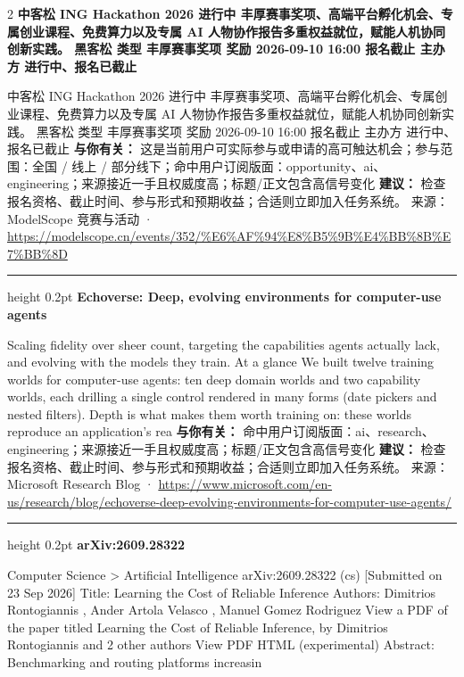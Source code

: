 \documentclass[10.5pt]{ctexart}
\begin{document}
\begin{multicols}{2}
{\large\bfseries 中客松 ING Hackathon 2026 进行中 丰厚赛事奖项、高端平台孵化机会、专属创业课程、免费算力以及专属 AI 人物协作报告多重权益就位，赋能人机协同创新实践。 黑客松 类型 丰厚赛事奖项 奖励 2026-09-10 16:00 报名截止 主办方 进行中、报名已截止}\par
中客松 ING Hackathon 2026 进行中 丰厚赛事奖项、高端平台孵化机会、专属创业课程、免费算力以及专属 AI 人物协作报告多重权益就位，赋能人机协同创新实践。 黑客松 类型 丰厚赛事奖项 奖励 2026-09-10 16:00 报名截止 主办方 进行中、报名已截止
\textbf{与你有关：} 这是当前用户可实际参与或申请的高可触达机会；参与范围：全国 / 线上 / 部分线下；命中用户订阅版面：opportunity、ai、engineering；来源接近一手且权威度高；标题/正文包含高信号变化
\textbf{建议：} 检查报名资格、截止时间、参与形式和预期收益；合适则立即加入任务系统。
{\footnotesize\color{ormuted} 来源：ModelScope 竞赛与活动 · \url{https://modelscope.cn/events/352/%E6%AF%94%E8%B5%9B%E4%BB%8B%E7%BB%8D}}
\vspace{2mm}
\hrule height 0.2pt
\vspace{2mm}
{\large\bfseries Echoverse: Deep, evolving environments for computer-use agents}\par
Scaling fidelity over sheer count, targeting the capabilities agents actually lack, and evolving with the models they train. At a glance We built twelve training worlds for computer-use agents: ten deep domain worlds and two capability worlds, each drilling a single control rendered in many forms (date pickers and nested filters). Depth is what makes them worth training on: these worlds reproduce an application’s rea
\textbf{与你有关：} 命中用户订阅版面：ai、research、engineering；来源接近一手且权威度高；标题/正文包含高信号变化
\textbf{建议：} 检查报名资格、截止时间、参与形式和预期收益；合适则立即加入任务系统。
{\footnotesize\color{ormuted} 来源：Microsoft Research Blog · \url{https://www.microsoft.com/en-us/research/blog/echoverse-deep-evolving-environments-for-computer-use-agents/}}
\vspace{2mm}
\hrule height 0.2pt
\vspace{2mm}
{\large\bfseries arXiv:2609.28322}\par
Computer Science > Artificial Intelligence arXiv:2609.28322 (cs) [Submitted on 23 Sep 2026] Title: Learning the Cost of Reliable Inference Authors: Dimitrios Rontogiannis , Ander Artola Velasco , Manuel Gomez Rodriguez View a PDF of the paper titled Learning the Cost of Reliable Inference, by Dimitrios Rontogiannis and 2 other authors View PDF HTML (experimental) Abstract: Benchmarking and routing platforms increasin

\end{multicols}
\end{document}

